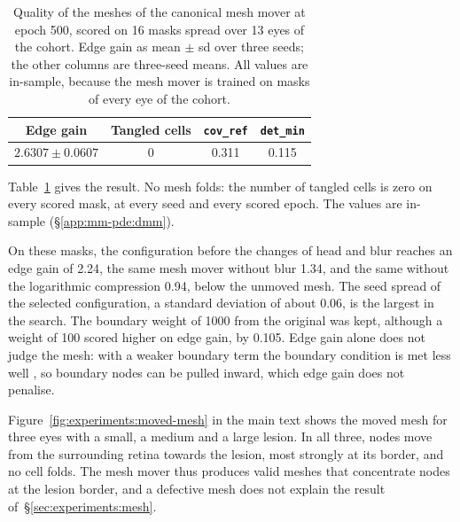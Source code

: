 \begin{table}[t]
  \centering
  \caption[Quality of the moved meshes.]{%
    Quality of the meshes of the canonical mesh mover at epoch 500, scored
    on 16 masks spread over 13 eyes of the cohort. Edge gain as mean
    $\pm$ sd over three seeds; the other columns are three-seed means. All
    values are in-sample, because the mesh mover is trained on masks of
    every eye of the cohort.}
  \label{tab:appendix:mesh-quality}
  \small
  \begin{tabular}{c c c c}
    \toprule
    Edge gain & Tangled cells & \texttt{cov\_ref} & \texttt{det\_min} \\
    \midrule
    $2.6307 \pm 0.0607$ & 0 & 0.311 & 0.115 \\
    \bottomrule
  \end{tabular}
\end{table}

Table~\ref{tab:appendix:mesh-quality} gives the result. No mesh folds: the
number of tangled cells is zero on every scored mask, at every seed and
every scored epoch. The values are in-sample (\S\ref{app:mm-pde:dmm}).

On these masks, the configuration before the changes of head and blur
reaches an edge gain of 2.24, the same mesh mover without blur 1.34, and
the same without the logarithmic compression 0.94, below the unmoved mesh.
The seed spread of the selected configuration, a standard deviation of
about 0.06, is the largest in the search. The boundary weight of 1000
from the original was kept, although a weight of 100 scored higher on edge
gain, by 0.105. Edge gain alone does not judge the mesh: with a weaker
boundary term the boundary condition is met less well
\citep[Appendix~C.3]{Hu2024}, so boundary nodes can be pulled inward,
which edge gain does not penalise.

Figure~\ref{fig:experiments:moved-mesh} in the main text shows the moved
mesh for three eyes with a small, a medium and a large lesion. In all
three, nodes move from the surrounding retina towards the lesion, most
strongly at its border, and no cell folds. The mesh mover thus produces
valid meshes that concentrate nodes at the lesion border, and a defective
mesh does not explain the result of~\S\ref{sec:experiments:mesh}.


